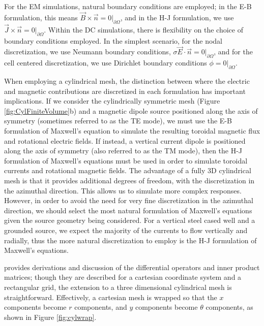 For the EM simulations, natural boundary conditions are employed; in the E-B formulation, this means $\vec{B}\times\vec{n} = 0\vert_{\partial \Omega}$, and in the H-J formulation, we use $\vec{J}\times\vec{n} = 0\vert_{\partial \Omega}$. Within the DC simulations, there is flexibility on the choice of boundary conditions employed. In the simplest scenario, for the nodal discretization, we use Neumann boundary conditions, $\sigma\vec{E} \cdot \vec{n} = 0\vert_{\partial \Omega}$, and for the cell centered discretization, we use Dirichlet boundary conditions $\phi = 0\vert_{\partial \Omega}$.

When employing a cylindrical mesh, the distinction between where the electric and magnetic contributions are discretized in each formulation has important implications. If we consider the cylindrically symmetric mesh (Figure \ref{fig:CylFiniteVolume}b) and a magnetic dipole source positioned along the axis of symmetry (sometimes referred to as the TE mode), we must use the E-B formulation of Maxwell's equation to simulate the resulting toroidal magnetic flux and rotational electric fields. If instead, a vertical current dipole is positioned along the axis of symmetry (also referred to as the TM mode), then the H-J formulation of Maxwell's equations must be used in order to simulate toroidal currents and rotational magnetic fields. The advantage of a fully 3D cylindrical mesh is that it provides additional degrees of freedom, with the discretization in the azimuthal direction. This allows us to simulate more complex responses. However, in order to avoid the need for very fine discretization in the azimuthal direction, we should select the most natural formulation of Maxwell's equations given the source geometry being considered. For a vertical steel cased well and a grounded source, we expect the majority of the currents to flow vertically and radially, thus the more natural discretization to employ is the H-J formulation of Maxwell's equations.

\cite{Haber2014} provides derivations and discussion of the differential operators and inner product matrices; though they are described for a cartesian coordinate system and a rectangular grid, the extension to a three dimensional cylindrical mesh is straightforward. Effectively, a cartesian mesh is wrapped so that the $x$ components become $r$ components, and $y$ components become $\theta$ components, as shown in Figure \ref{fig:cylwrap}.




